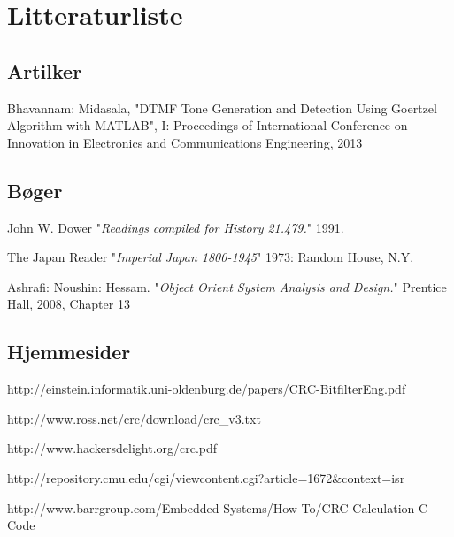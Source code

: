 \section{Litteraturliste}
\begingroup
\renewcommand{\section}[2]{}%

\begin{thebibliography}{1}
	\subsection{Artilker}
	  Bhavannam: Midasala, "DTMF Tone Generation and Detection Using Goertzel Algorithm with MATLAB", I: Proceedings of International Conference on Innovation in Electronics and Communications Engineering, 2013
	
	\subsection{Bøger}
   John W. Dower "{\em Readings compiled for History
  21.479.}"  1991. %

    The Japan Reader "{\em Imperial Japan 1800-1945}" 1973:
  Random House, N.Y. %
  
   Ashrafi: Noushin: Hessam. "{\em Object Orient System Analysis and Design.}" Prentice Hall, 2008, Chapter 13
  
	\subsection{Hjemmesider}
   {http://einstein.informatik.uni-oldenburg.de/papers/CRC-BitfilterEng.pdf}

   {http://www.ross.net/crc/download/crc\_v3.txt}
  
   {http://www.hackersdelight.org/crc.pdf}
  
  {http://repository.cmu.edu/cgi/viewcontent.cgi?article=1672\&context=isr}
  
  {http://www.barrgroup.com/Embedded-Systems/How-To/CRC-Calculation-C-Code}
  \end{thebibliography}